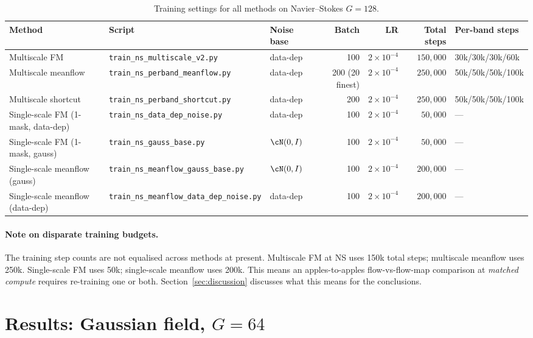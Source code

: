 \documentclass[11pt]{article}
\begin{document}
\begin{table}[ht]
\centering
\small
\caption{Training settings for all methods on Navier–Stokes $G=128$.}
\label{tab:train-ns}
\begin{tabular}{@{}lllrrrl@{}}
\toprule
Method & Script & Noise base & Batch & LR & Total steps & Per-band steps \\
\midrule
Multiscale FM
   & \texttt{train\_ns\_multiscale\_v2.py} & data-dep & 100 & $2\times 10^{-4}$ & $150{,}000$ & 30k/30k/30k/60k \\
Multiscale meanflow
   & \texttt{train\_ns\_perband\_meanflow.py} & data-dep & 200 (20 finest) & $2\times 10^{-4}$ & $250{,}000$ & 50k/50k/50k/100k \\
Multiscale shortcut
   & \texttt{train\_ns\_perband\_shortcut.py} & data-dep & 200 & $2\times 10^{-4}$ & $250{,}000$ & 50k/50k/50k/100k \\
Single-scale FM (1-mask, data-dep)
   & \texttt{train\_ns\_data\_dep\_noise.py} & data-dep & 100 & $2\times 10^{-4}$ & $50{,}000$ & --- \\
Single-scale FM (1-mask, gauss)
   & \texttt{train\_ns\_gauss\_base.py} & $\cN(0,I)$ & 100 & $2\times 10^{-4}$ & $50{,}000$ & --- \\
Single-scale meanflow (gauss)
   & \texttt{train\_ns\_meanflow\_gauss\_base.py} & $\cN(0,I)$ & 100 & $2\times 10^{-4}$ & $200{,}000$ & --- \\
Single-scale meanflow (data-dep)
   & \texttt{train\_ns\_meanflow\_data\_dep\_noise.py} & data-dep & 100 & $2\times 10^{-4}$ & $200{,}000$ & --- \\
\bottomrule
\end{tabular}
\end{table}

\paragraph{Note on disparate training budgets.}
The training step counts are not equalised across methods at present. Multiscale FM at NS uses 150k total steps; multiscale meanflow uses 250k. Single-scale FM uses 50k; single-scale meanflow uses 200k. This means an apples-to-apples flow-vs-flow-map comparison at \emph{matched compute} requires re-training one or both. Section~\ref{sec:discussion} discusses what this means for the conclusions.

\section{Results: Gaussian field, $G=64$}
\label{sec:gf}
\end{document}
